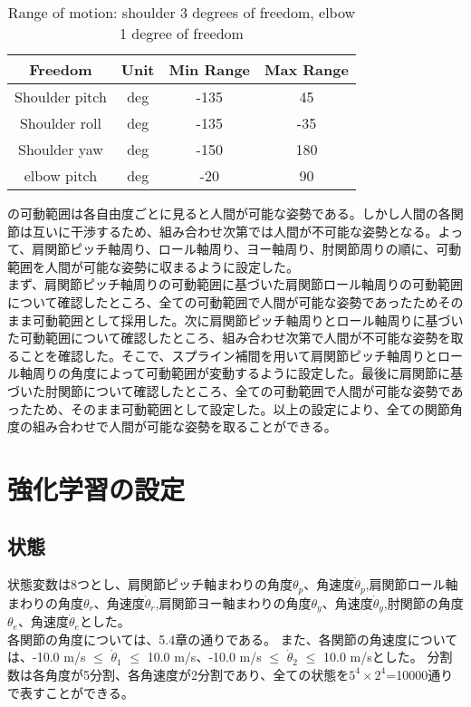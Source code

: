 \begin{table}[tb]
  \begin{center}
    \caption{Range of motion: shoulder 3 degrees of freedom, elbow 1 degree of freedom}

    \begin{tabular}{c c c c}
      \hline
      Freedom & Unit & Min Range & Max Range \\
      \hline
      Shoulder pitch & deg & -135 & 45 \\
      Shoulder roll & deg & -135 & -35 \\
      Shoulder yaw & deg & -150 & 180 \\
      elbow pitch & deg & -20 & 90 \\
      \hline
    \end{tabular}
  \end{center}
\end{table}

の可動範囲は各自由度ごとに見ると人間が可能な姿勢である。しかし人間の各関節は互いに干渉するため、組み合わせ次第では人間が不可能な姿勢となる。よって、肩関節ピッチ軸周り、ロール軸周り、ヨー軸周り、肘関節周りの順に、可動範囲を人間が可能な姿勢に収まるように設定した。\\
まず、肩関節ピッチ軸周りの可動範囲に基づいた肩関節ロール軸周りの可動範囲について確認したところ、全ての可動範囲で人間が可能な姿勢であったためそのまま可動範囲として採用した。次に肩関節ピッチ軸周りとロール軸周りに基づいた可動範囲について確認したところ、組み合わせ次第で人間が不可能な姿勢を取ることを確認した。そこで、スプライン補間を用いて肩関節ピッチ軸周りとロール軸周りの角度によって可動範囲が変動するように設定した。最後に肩関節に基づいた肘関節について確認したところ、全ての可動範囲で人間が可能な姿勢であったため、そのまま可動範囲として設定した。以上の設定により、全ての関節角度の組み合わせで人間が可能な姿勢を取ることができる。

\section{強化学習の設定}
\subsection{状態}
状態変数は8つとし、肩関節ピッチ軸まわりの角度$\theta_{p}$、角速度$\dot{\theta}_{p}$,肩関節ロール軸まわりの角度$\theta_{r}$、角速度$\dot{\theta}_{r}$,肩関節ヨー軸まわりの角度$\theta_{y}$、角速度$\dot{\theta}_{y}$,肘関節の角度$\theta_{e}$、角速度$\dot{\theta}_{e}$とした。\\
各関節の角度については、5.4章の通りである。
また、各関節の角速度については、-10.0 m/s $\le$ $\dot{\theta}_{1}$ $\le$ 10.0 m/s、-10.0 m/s $\le$ $\dot{\theta}_{2}$ $\le$ 10.0 m/sとした。
分割数は各角度が5分割、各角速度が2分割であり、全ての状態を$5^{4}\times 2^{4}$=10000通りで表すことができる。
